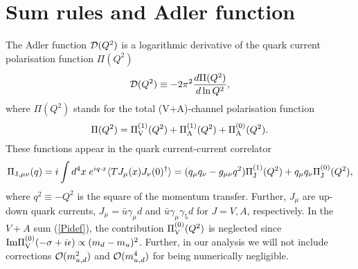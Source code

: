 \documentclass[aps,nofootinbib,showkeys,noshowpacs,preprintnumbers,amsmath,amssymb]{revtex4}
\def\be{\begin{equation}}
\def\ee{\end{equation}}
\begin{document}
\section{Sum rules and Adler function}
\label{sec:SRgen}

The Adler function ${\cal D}(Q^2)$ is a logarithmic derivative of the quark current polarisation function $\Pi(Q^2)$
\be
{\cal D}(Q^2) \equiv - 2 \pi^2 \frac{d \Pi(Q^2)}{d \ln Q^2} ,
\label{Ddef}
\ee   
where $\Pi(Q^2)$ stands for the total (V+A)-channel polarisation function
\be
\Pi(Q^2) = \Pi_{\rm V}^{(1)}(Q^2) + \Pi_{\rm A}^{(1)}(Q^2) + \Pi_{\rm A}^{(0)}(Q^2).
\label{Pidef}
\ee
These functions appear in the quark current-current correlator
\be
\Pi_{\rm{J}, \mu\nu}(q) =  i \int  d^4 x \; e^{i q \cdot x} 
\langle T J_{\mu}(x) J_{\nu}(0)^{\dagger} \rangle
=  (q_{\mu} q_{\nu} - g_{\mu \nu} q^2) \Pi_{\rm J}^{(1)}(Q^2)
+ q_{\mu} q_{\nu} \Pi_{\rm J}^{(0)}(Q^2),
\label{PiJ}
\ee
where $q^2 \equiv -Q^2$ is the square of the momentum transfer. Further, $J_{\mu}$ are up-down quark currents, $J_{\mu} = {\bar u} \gamma_{\mu} d$ and ${\bar u} \gamma_{\mu} \gamma_5 d$ for $J=V, A$, respectively. In the $V+A$ sum (\ref{Pidef}), the contribution $\Pi_{\rm V}^{(0)}(Q^2)$ is neglected since ${\rm Im} \Pi_{\rm V}^{(0)}(-\sigma + i \epsilon) \propto (m_d-m_u)^2$. Further, in our analysis we will not include corrections ${\cal O}(m^2_{u,d})$ and  ${\cal O}(m^4_{u,d})$ for being numerically negligible.
\end{document}
